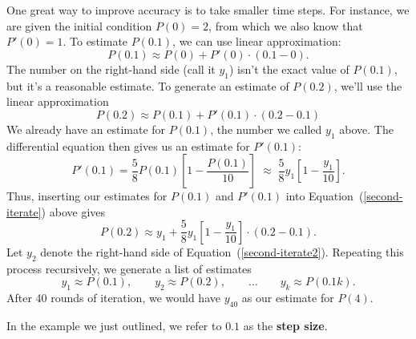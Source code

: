 \documentclass[main]{subfiles}
\begin{document}
\begin{enumerate}
\begin{enumerate}[resume]
  \begin{solution}
    One great way to improve accuracy is to take smaller time steps.
    For instance, we are given the initial condition $P(0) = 2$, from which
    we also know that $P'(0) = 1$.  To estimate $P(0.1)$, we can 
    use linear approximation:
    $$
      P(0.1) \approx P(0) + P'(0) \cdot (0.1 - 0).
    $$
    The number on the right-hand side (call it $y_1$) isn't the exact value of 
    $P(0.1)$, but it's a reasonable estimate.  
    To generate an estimate of $P(0.2)$, we'll use the linear approximation
    \begin{equation}
      \label{second-iterate}
      P(0.2) \approx P(0.1) + P'(0.1) \cdot (0.2 - 0.1)
    \end{equation}
    We already have an estimate for $P(0.1)$, the number we called $y_1$ above.
    The differential equation then gives us an estimate for $P'(0.1)$:
    $$
      P'(0.1) = \frac{5}{8} P(0.1) \left[ 1 - \frac{P(0.1)}{10} \right]
      \; \approx \; \frac{5}{8} y_{1} \left[ 1 - \frac{y_1}{10} \right].
    $$
    Thus, inserting our estimates for $P(0.1)$ and $P'(0.1)$ 
    into Equation~(\ref{second-iterate}) above gives
    \begin{equation}
      \label{second-iterate2}
      P(0.2) \approx y_{1} +  \frac{5}{8} y_{1} \left[ 1 - \frac{y_1}{10} \right] \cdot (0.2 - 0.1).
    \end{equation}
    Let $y_2$ denote the right-hand side of Equation~(\ref{second-iterate2}).
    Repeating this process recursively, we generate a list of estimates
    $$
      y_1 \approx P(0.1), \qquad y_{2} \approx P(0.2), \qquad \dots \qquad
      y_k \approx P(0.1k).
    $$
    After 40 rounds of iteration, we would have $y_{40}$ as our estimate for $P(4)$.      


  In the example we just outlined, we refer to $0.1$ as the \textbf{step size}.
  \end{solution}
  
\end{enumerate}



\end{enumerate}
\end{document}

